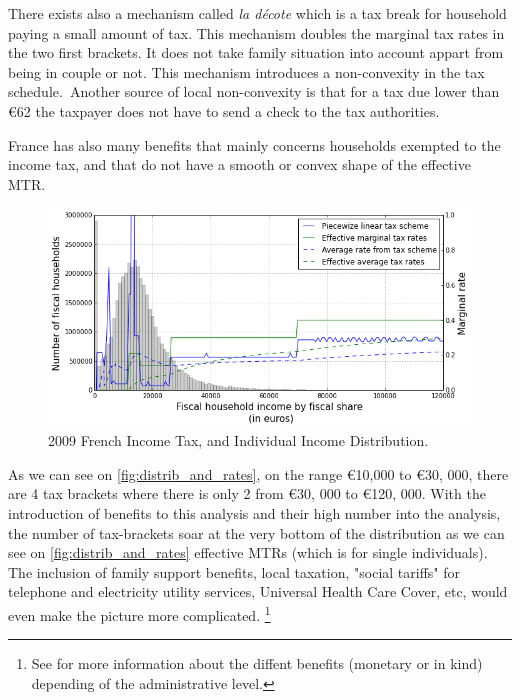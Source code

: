 There exists also a mechanism called \emph{la d\'{e}cote} which is a tax break
for household paying a small amount of tax. This mechanism doubles the
marginal tax rates in the two first brackets. It does not take family
situation into account appart from being in couple or not. This mechanism
introduces a non-convexity in the tax schedule.\ Another source of local
non-convexity is that for a tax due lower than \euro62 the taxpayer does not
have to send a check to the tax authorities.\ 

France has also many benefits that mainly concerns households exempted to the
income tax, and that do not have a smooth or convex shape of the effective MTR.

\begin{figure}[ptb]
\caption{2009 French Income Tax, and Individual Income Distribution.}%
\label{fig:distrib_and_rates}
\par
\begin{center}
\includegraphics[width=\textwidth]{fiscal_household_income_distr_with_rates.png}
\end{center}
\end{figure}

As we can see on \autoref{fig:distrib_and_rates}, on the range \euro10,000 to
\euro30, 000, there are 4 tax brackets where there is only 2 from \euro30, 000
to \euro120, 000. With the introduction of benefits to this analysis and their
high number into the analysis, the number of tax-brackets soar at the very
bottom of the distribution as we can see on \autoref{fig:distrib_and_rates}
effective MTRs (which is for single individuals). The inclusion of family
support benefits, local taxation, "social tariffs" for telephone and
electricity utility services, Universal Health Care Cover, etc, would even
make the picture more complicated. \footnote{See \citet{anne2012rsa} for more
information about the diffent benefits (monetary or in kind) depending of the
administrative level.}

